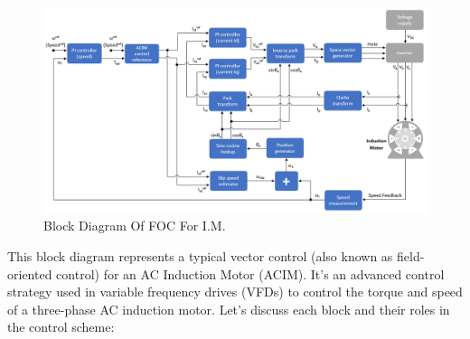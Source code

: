 \begin{figure}
\centering
\includegraphics[width=5.9in]{sections/section2/images/blockDiagram.png}
\caption{Block Diagram Of FOC For I.M.}
\label{fig:FOCblock}
\end{figure}



This block diagram represents a typical vector control (also known as field-oriented control) for an AC Induction Motor (ACIM). It's an advanced control strategy used in variable frequency drives (VFDs) to control the torque and speed of a three-phase AC induction motor. Let's discuss each block and their roles in the control scheme:

